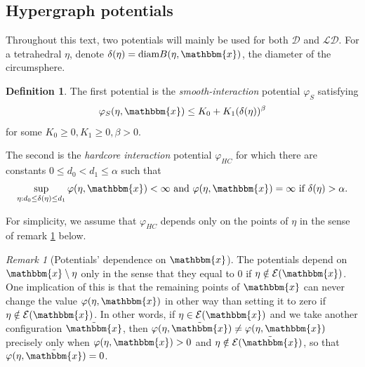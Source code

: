 \documentclass[12pt,a4paper]{article}
\theoremstyle{definition}
\newtheorem{definition}{Definition}
\theoremstyle{remark}
\newtheorem{remark}{Remark}
\theoremstyle{theorem}
\newcommand{\x}{\mathbbm{x}}
\begin{document}
\subsection{Hypergraph potentials}
Throughout this text, two potentials will mainly be used for both $\mathcal D$ and $\mathcal {LD}$. For a tetrahedral $\eta$, denote $\delta(\eta)=\text{diam}B(\eta,\x)$, the diameter of the circumsphere. 


\begin{definition}
	The first potential is the \textit{smooth-interaction} potential $\varphi_S$ satisfying $$\varphi_S(\eta,\x) \leq K_0 + K_1(\delta(\eta))^\beta$$for some $K_0 \geq 0, K_1 \geq 0, \beta > 0$.

The second is the \textit{hardcore interaction} potential $\varphi_{HC}$ for which there are constants $0\leq d_0 < d_1 \leq \alpha$  such that
$$\sup_{\eta: d_0 \leq \delta(\eta) \leq d_1} \varphi(\eta,\x) < \infty \text{ and } \varphi(\eta,\x)=\infty \text{ if } \delta(\eta)>\alpha.$$ 
\end{definition}
For simplicity, we assume that $\varphi_{HC}$ depends only on the points of $\eta$ in the sense of remark \ref{r:potential} below.


\begin{remark}[Potentials' dependence on $\x$]\label{r:potential}
	The potentials depend on $\x \setminus \eta$ only in the sense that they equal to $0$ if $\eta \notin \mathcal E(\x)$. One implication of this is that the remaining points of $\x$ can never change the value $\varphi(\eta,\x)$ in other way than setting it to zero if $\eta \notin \mathcal E(\x)$. In other words, if $\eta \in \mathcal E(\x)$ and we take another configuration $\tilde{\x}$, then $\varphi(\eta,\tilde{\x}) \neq \varphi(\eta,\x)$ precisely only when $\varphi(\eta,\x) > 0$  and $\eta \notin \mathcal E(\tilde{\x})$, so that $\varphi(\eta,\tilde{\x})=0$.
\end{remark}
\end{document}
